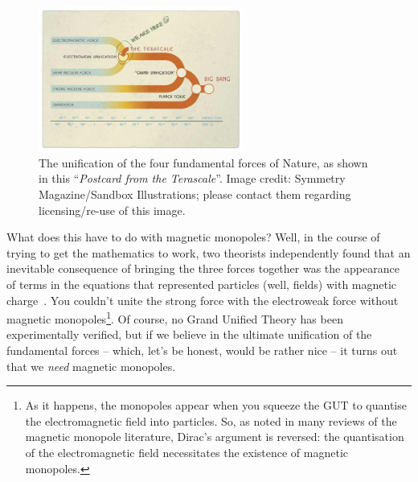 %
\begin{figure}[htbp]
  \centering
  \includegraphics[width=0.6\textwidth]{assets/images/force-unification/force-unification.jpg}
  \caption[The unification of the four fundamental forces of Nature]
  {\label{fig:forceunification}%
The unification of the four fundamental forces of Nature,
as shown in this ``\emph{Postcard from the Terascale}''.
Image credit: Symmetry Magazine/Sandbox Illustrations; please contact them
regarding licensing/re-use of this image.}
\end{figure}
%

What does this have to do with magnetic monopoles?
Well, in the course of trying to get the mathematics to work,
two theorists independently found that an inevitable consequence of bringing
the three forces together was the appearance of terms in the equations that
represented particles (well, fields) with
magnetic charge~\cite{tHooft1974,Polyakov1974}.
You couldn't unite the strong force with the electroweak force
without magnetic monopoles\footnote{%
As it happens, the monopoles appear when you squeeze the \ac{GUT} to
quantise the electromagnetic field into particles.
So, as noted in many reviews of the magnetic monopole literature,
Dirac’s argument is reversed: the quantisation of the electromagnetic
field necessitates the existence of magnetic monopoles.}.
%
Of course, no Grand Unified Theory has been experimentally verified,
but if we believe in the ultimate unification of the
fundamental forces -- which, let’s be honest, would be rather nice -- it
turns out that we \emph{need} magnetic monopoles.

